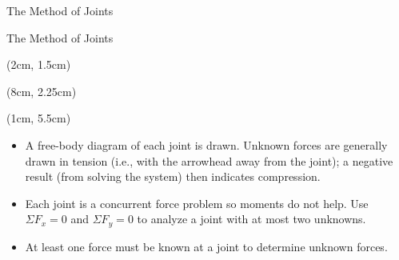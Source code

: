 \documentclass[9pt, xcolor={svgnames, x11names},professionalfonts]{beamer}
\def\scale{1}
\begin{document}

\begin{frame}{The Method of Joints}

	\hfill
	\mini[0.5]{
		\def\scale{0.75}
		
	}

\end{frame}


\begin{frame}{The Method of Joints}

	\begin{textblock*}{0.4\textwidth}(2cm, 1.5cm)
		\def\scale{0.65}
		
	\end{textblock*}
	\begin{textblock*}{0.4\textwidth}(8cm, 2.25cm)
		
	\end{textblock*}

	\begin{textblock*}{1\textwidth}(1cm, 5.5cm)
		\centering
		\begin{itemize}
			\item<1-> A free-body diagram of each joint is drawn. Unknown forces are generally drawn in tension (i.e., with the arrowhead away from the joint); a negative result (from solving the system) then indicates compression. \parm
			\item<2-> Each joint is a concurrent force problem so moments do not help. Use $\Sigma F_x = 0$ and $\Sigma F_y = 0$ to analyze a joint with at most two unknowns. \parm
			\item<3> At least one force must be known at a joint to determine unknown forces.
		\end{itemize}
	\end{textblock*}
\end{frame}
\end{document}
